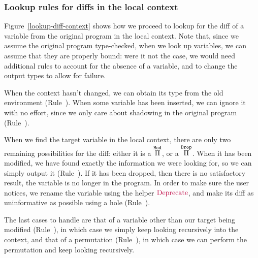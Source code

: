\subsubsection{Lookup rules for diffs in the local context}

Figure~\ref{lookup-diff-context} shows how we proceed to lookup for the diff of
a variable from the original program in the local context.  Note that, since we
assume the original program type-checked, when we look up variables, we can
assume that they are properly bound: were it not the case, we would need
additional rules to account for the absence of a variable, and to change the
output types to allow for failure.

When the context hasn't changed, we can obtain its type from the old environment
(Rule~).  When some variable has been inserted, we can
ignore it with no effort, since we only care about shadowing in the original
program (Rule~).

When we find the target variable in the local context, there are only two
remaining possibilities for the diff: either it is a $\overset{\mathtt{Mod}}{\Pi}$, or a
$\overset{\mathtt{Drop}}{\Pi}$.  When it has been modified, we have found exactly the
information we were looking for, so we can simply output it
(Rule~).  If it has been dropped, then there is no
satisfactory result, the variable is no longer in the program.  In order to make
sure the user notices, we rename the variable using the helper
$\textcolor{purple}{\text{Deprecate}}$, and make its diff as uninformative as possible using a
hole (Rule~).

The last cases to handle are that of a variable other than our target being
modified (Rule~), in which case we simply keep looking
recursively into the context, and that of a permutation
(Rule~), in which case we can perform the permutation
and keep looking recursively.

